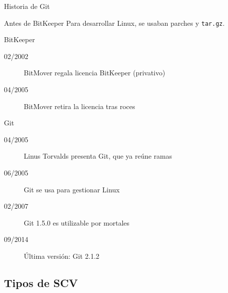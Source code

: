 \documentclass[xcolor=svgnames]{beamer}
\begin{document}
\begin{frame}{Historia de Git}

  \begin{block}{Antes de BitKeeper}
    Para desarrollar Linux, se usaban parches y \texttt{tar.gz}.
  \end{block}

  \begin{block}{BitKeeper}
    \begin{description}
    \item[02/2002] BitMover regala licencia BitKeeper (privativo)
    \item[04/2005] BitMover retira la licencia tras roces
    \end{description}
  \end{block}

  \begin{block}{Git}
    \begin{description}
    \item[04/2005] Linus Torvalds presenta Git, que ya reúne ramas
    \item[06/2005] Git se usa para gestionar Linux
    \item[02/2007] Git 1.5.0 es utilizable por mortales
    \item[09/2014] Última versión: Git 2.1.2
    \end{description}
  \end{block}

\end{frame}

\subsection{Tipos de SCV}
\end{document}
